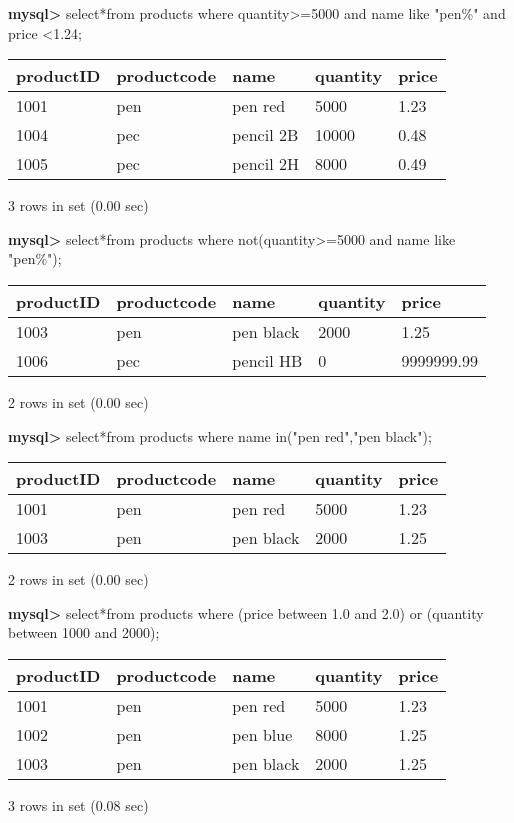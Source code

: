 \documentclass[11pt]{article}
\begin{document}
\textbf{mysql>} select*from products where quantity>=5000 and name like "pen\%" and price <1.24;
\begin{center}
\begin{tabular}{|l|l|l|l|l|}
\hline
productID & productcode & name & quantity & price \\
\hline
1001 & pen & pen red & 5000 & 1.23 \\
1004 & pec & pencil 2B & 10000 & 0.48 \\
1005 & pec & pencil 2H & 8000 & 0.49 \\
\hline
\end{tabular}
\end{center}
3 rows in set (0.00 sec)

\textbf{mysql>} select*from products where not(quantity>=5000 and name like "pen\%");
\begin{center}
\begin{tabular}{|l|l|l|l|l|}
\hline
productID & productcode & name & quantity & price \\
\hline
1003 & pen & pen black & 2000 & 1.25 \\
1006 & pec & pencil HB & 0 & 9999999.99 \\
\hline
\end{tabular}
\end{center}
2 rows in set (0.00 sec)

\textbf{mysql>} select*from products where name in("pen red","pen black");
\begin{center}
\begin{tabular}{|l|l|l|l|l|}
\hline
productID & productcode & name & quantity & price \\
\hline
1001 & pen & pen red & 5000 & 1.23 \\
1003 & pen & pen black & 2000 & 1.25 \\
\hline
\end{tabular}
\end{center}
2 rows in set (0.00 sec)

\textbf{mysql>} select*from products where (price between 1.0 and 2.0) or (quantity between 1000 and 2000);
\begin{center}
\begin{tabular}{|l|l|l|l|l|}
\hline
productID & productcode & name & quantity & price \\
\hline
1001 & pen & pen red & 5000 & 1.23 \\
1002 & pen & pen blue & 8000 & 1.25 \\
1003 & pen & pen black & 2000 & 1.25 \\
\hline
\end{tabular}
\end{center}
3 rows in set (0.08 sec)
\end{document}
